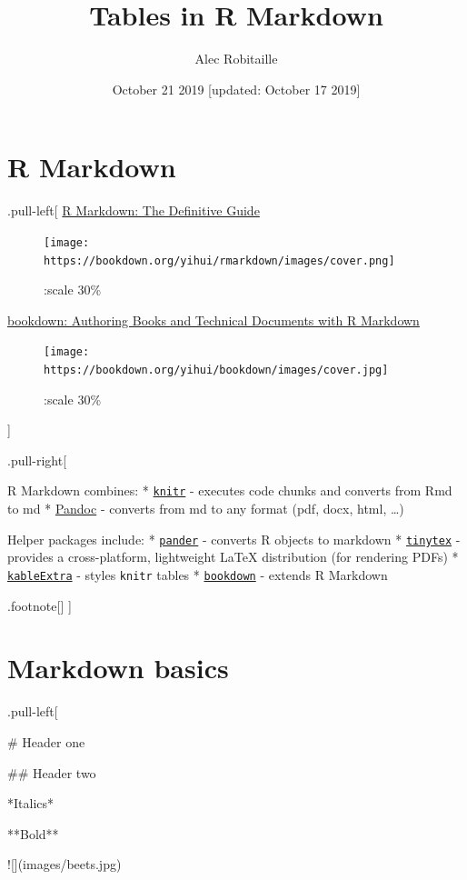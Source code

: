 \documentclass[]{article}
\title{Tables in R Markdown}
\author{Alec Robitaille}
\date{October 21 2019 {[}updated: October 17 2019{]}}
\newenvironment{Shaded}{\begin{snugshade}}{\end{snugshade}}
\newcommand{\FunctionTok}[1]{\textcolor[rgb]{0.00,0.00,0.00}{#1}}
\newcommand{\NormalTok}[1]{#1}
\begin{document}
\maketitle

\hypertarget{r-markdown}{%
\section{R Markdown}\label{r-markdown}}

.pull-left{[} \href{https://bookdown.org/yihui/rmarkdown/}{R Markdown:
The Definitive Guide}

\begin{figure}
\centering
\texttt{[image: https://bookdown.org/yihui/rmarkdown/images/cover.png]}
\caption{:scale 30\%}
\end{figure}

\href{https://bookdown.org/yihui/bookdown/}{bookdown: Authoring Books
and Technical Documents with R Markdown}

\begin{figure}
\centering
\texttt{[image: https://bookdown.org/yihui/bookdown/images/cover.jpg]}
\caption{:scale 30\%}
\end{figure}

{]}

.pull-right{[}

R Markdown combines: *
\href{https://github.com/yihui/knitr}{\texttt{knitr}} - executes code
chunks and converts from Rmd to md * \href{https://pandoc.org/}{Pandoc}
- converts from md to any format (pdf, docx, html, \ldots)

Helper packages include: *
\href{https://github.com/Rapporter/pander}{\texttt{pander}} - converts R
objects to markdown *
\href{https://github.com/yihui/tinytex}{\texttt{tinytex}} - provides a
cross-platform, lightweight LaTeX distribution (for rendering PDFs) *
\href{https://github.com/haozhu233/kableExtra}{\texttt{kableExtra}} -
styles \texttt{knitr} tables *
\href{https://github.com/rstudio/bookdown}{\texttt{bookdown}} - extends
R Markdown

.footnote{[}{]} {]}

\hypertarget{markdown-basics}{%
\section{Markdown basics}\label{markdown-basics}}

.pull-left{[}

\begin{Shaded}
\begin{Highlighting}[]
\FunctionTok{\# Header one}






\FunctionTok{\#\# Header two}



\NormalTok{*Italics*}


\NormalTok{**Bold**}





\NormalTok{![](images/beets.jpg)}
\end{Highlighting}
\end{Shaded}
\end{document}
